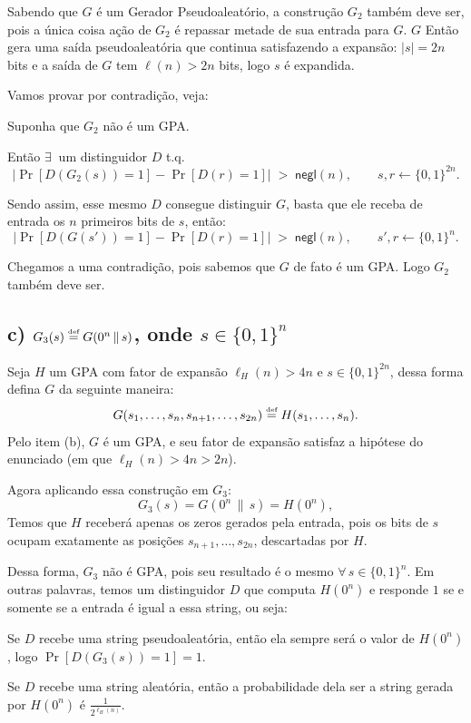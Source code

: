 \documentclass[11pt,a4paper]{article}
\newcommand{\negl}{\mathsf{negl}}
\newcommand{\defeq}{\stackrel{\text{\tiny def}}{=}}
\begin{document}
Sabendo que $G$ é um Gerador Pseudoaleatório, a construção $G_2$ também deve ser, pois a única
coisa ação de $G_2$ é repassar metade de sua entrada para $G$. $G$ Então gera uma saída pseudoaleatória
que continua satisfazendo a expansão: $|s| = 2n$ bits e a saída de $G$ tem $\ell(n) > 2n$ bits,
logo $s$ é expandida.

Vamos provar por contradição, veja:

Suponha que $G_2$ não é um GPA\@.

Então $\exists\ $ um distinguidor $D$ t.q.
\[
    \bigl|\Pr[D(G_2(s)) = 1] - \Pr[D(r) = 1]\bigr| \;>\; \negl(n),
    \qquad s, r \leftarrow \{0,1\}^{2n}.
\]

Sendo assim, esse mesmo $D$ consegue distinguir $G$, basta que ele receba de entrada
os $n$ primeiros bits de $s$, então:
\[
    \bigl|\Pr[D(G(s')) = 1] - \Pr[D(r) = 1]\bigr| \;>\; \negl(n),
    \qquad s', r \leftarrow \{0,1\}^{n}.
\]

Chegamos a uma contradição, pois sabemos que $G$ de fato é um GPA. Logo $G_2$ também deve ser.

\clearpage

\subsection*{c) $G_3(s) \defeq G(0^{n} \,\|\, s)$, onde
    $s \in \{0,1\}^{n}$}

Seja $H$ um GPA com fator de expansão $\ell_H(n) > 4n$ e $s \in \{0,1\}^{2n}$,
dessa forma defina $G$ da seguinte maneira:
\[
    G(s_1,\ldots,s_n,s_{n+1},\ldots,s_{2n}) \defeq H(s_1,\ldots,s_n).
\]
Pelo item (b), $G$ é um GPA, e seu fator de expansão satisfaz a hipótese do
enunciado (em que $\ell_H(n) > 4n > 2n$).

Agora aplicando essa construção em $G_3$:
\[
    G_3(s) = G(0^{n} \,\|\, s) = H(0^{n}),
\]
Temos que $H$ receberá apenas os zeros gerados pela entrada, 
pois os bits de $s$ ocupam exatamente as posições $s_{n+1},\ldots,s_{2n}$, descartadas por $H$.

Dessa forma, $G_3$ não é GPA, pois seu resultado é o mesmo
$\forall\, s \in \{0,1\}^{n}$. 
Em outras palavras, temos um distinguidor $D$ que computa $H(0^{n})$ e responde $1$ se e 
somente se a entrada é igual a essa string, ou seja:

Se $D$ recebe uma string pseudoaleatória, então ela sempre será o valor de
$H(0^{n})$, logo $\Pr[D(G_3(s)) = 1] = 1$.

Se $D$ recebe uma string aleatória, então a probabilidade dela ser a string
gerada por $H(0^{n})$ é $\frac{1}{2^{\ell_H(n)}}$.
\end{document}
